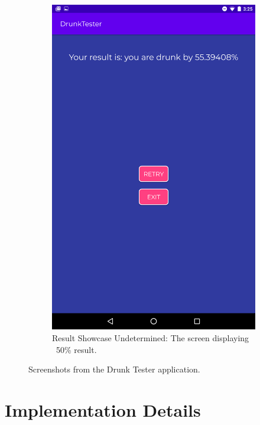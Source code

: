 \documentclass[12pt,a4paper]{article}
\begin{document}
\begin{figure}[htb!]
\begin{subfigure}[b]{0.35\textwidth}
        \includegraphics[width=\textwidth]{materials/Result_showcase_undetermined.png}
        \caption*{Result Showcase Undetermined: The screen displaying ~50\% result.}
    \end{subfigure}
    
    \caption*{Screenshots from the Drunk Tester application.}
\end{figure}

\newpage

\section{Implementation Details}
\end{document}
